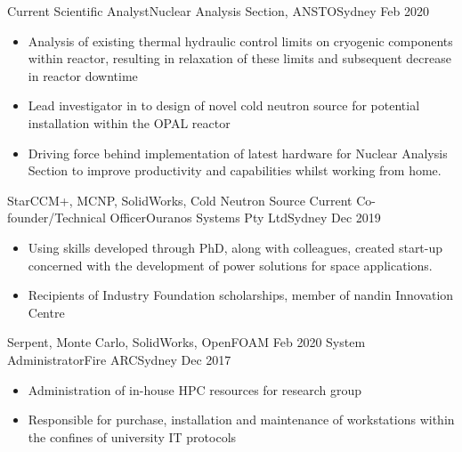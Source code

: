 %
%
%
\begin{experiences}
  \experience
    {Current}   {Scientific Analyst}{Nuclear Analysis Section, ANSTO}{Sydney}
    {Feb 2020} {
                      \begin{itemize}
                        \item Analysis of existing thermal hydraulic control limits on cryogenic components within reactor, resulting in relaxation of these limits and subsequent decrease in reactor downtime
                        \item Lead investigator in to design of novel cold neutron source for potential installation within the OPAL reactor
                        \item Driving force behind implementation of latest hardware for Nuclear Analysis Section to improve productivity and capabilities whilst working from home.  
                      \end{itemize}
                    }
                    {StarCCM+, MCNP, SolidWorks, Cold Neutron Source}
  \emptySeparator
  \experience
    {Current}   {Co-founder/Technical Officer}{Ouranos Systems Pty Ltd}{Sydney}
    {Dec 2019} {
                      \begin{itemize}
                        \item Using skills developed through PhD, along with colleagues, created start-up concerned with the development of power solutions for space applications.
                        \item Recipients of Industry Foundation scholarships, member of nandin Innovation Centre
                      \end{itemize}
                    }
                    {Serpent, Monte Carlo, SolidWorks, OpenFOAM}
  \emptySeparator
  \experience
    {Feb 2020} {System Administrator}{Fire ARC}{Sydney}
    {Dec 2017} {
                    \begin{itemize}
                        \item Administration of in-house HPC resources for research group
                        \item Responsible for purchase, installation and maintenance of workstations within the confines of university IT protocols

\end{itemize}}
\end{experiences}
